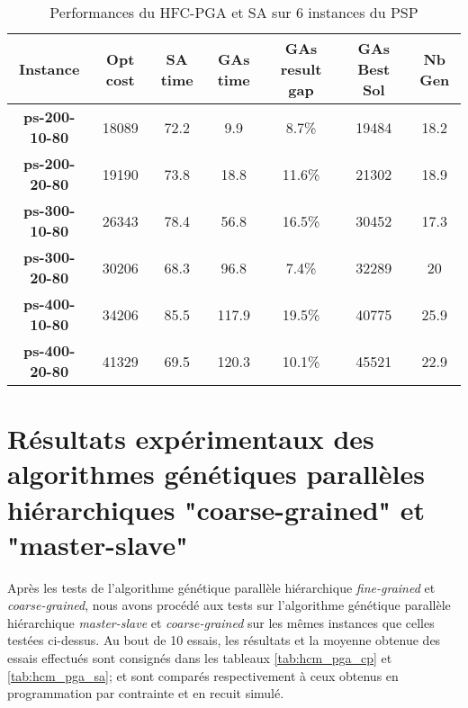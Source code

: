 	\begin{table}[h]
		\centering
		\begin{tabular}{|c|c|c|c|c|c|c|}
			\hline
			\textbf{Instance} & \textbf{Opt cost} & \textbf{SA time} & \textbf{GAs time} & \textbf{GAs result gap} & \textbf{GAs Best Sol} & \textbf{Nb Gen}\\
			\hline
			\textbf{ps-200-10-80} & 18089 & 72.2 & 9.9 & 8.7\% & 19484 & 18.2 \\
			\textbf{ps-200-20-80} & 19190 & 73.8 & 18.8 & 11.6\% & 21302 & 18.9 \\
			\textbf{ps-300-10-80} & 26343 & 78.4 & 56.8 & 16.5\% & 30452 & 17.3 \\
			\textbf{ps-300-20-80} & 30206 & 68.3 & 96.8 & 7.4\% & 32289 & 20 \\
			\textbf{ps-400-10-80} & 34206 & 85.5 & 117.9 & 19.5\% & 40775 & 25.9 \\
			\textbf{ps-400-20-80} & 41329 & 69.5 & 120.3 & 10.1\% & 45521 & 22.9 \\
			\hline
		\end{tabular}	
		\caption{Performances du HFC-PGA et SA sur 6 instances du PSP}
		\label{tab:hfc_pga_sa}	
	\end{table}			
		
		\section{Résultats expérimentaux des algorithmes génétiques parallèles hiérarchiques "coarse-grained" et "master-slave"}
		
		Après les tests de l'algorithme génétique parallèle hiérarchique \emph{fine-grained} et \emph{coarse-grained}, nous avons procédé aux tests sur l'algorithme génétique parallèle hiérarchique \emph{master-slave} et \emph{coarse-grained} sur les mêmes instances que celles testées ci-dessus. Au bout de 10 essais, les résultats et la moyenne obtenue des essais effectués sont consignés dans les tableaux \ref{tab:hcm_pga_cp}  et \ref{tab:hcm_pga_sa}; et sont comparés respectivement à ceux obtenus en programmation par contrainte et en recuit simulé.
		
